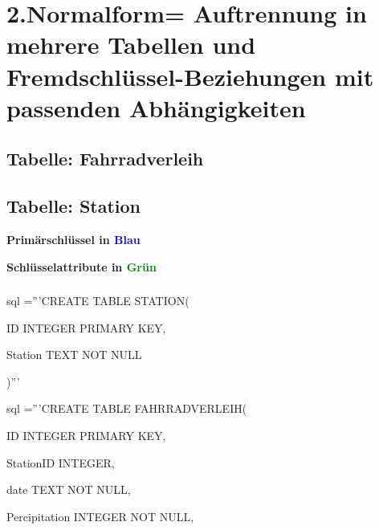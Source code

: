 \documentclass{article}
\begin{document}
\section*{2.Normalform= Auftrennung in mehrere Tabellen und
Fremdschlüssel-Beziehungen mit passenden Abhängigkeiten
}

\subsection*{Tabelle: Fahrradverleih}


\subsection*{Tabelle: Station}


\textbf{Primärschlüssel in \textcolor{blue}{Blau}}

\textbf{Schlüsselattribute in \textcolor{green}{Grün}}

\subsubsection{}

sql ='''CREATE TABLE STATION(
   
ID INTEGER PRIMARY KEY,
 
  Station TEXT NOT NULL

)'''

sql ='''CREATE TABLE FAHRRADVERLEIH(
 
 ID INTEGER PRIMARY KEY,
  
StationID INTEGER,
  
date TEXT NOT NULL,
 
 Percipitation INTEGER NOT NULL,
  
\end{document}
